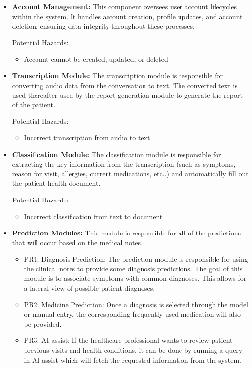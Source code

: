 \documentclass{article}
\begin{document}
\begin{itemize}
    \item \textbf{Account Management:}
    This component oversees user account lifecycles within the system. It handles account creation, profile updates, and account deletion, ensuring data integrity throughout these processes.
    
    Potential Hazards:
    \begin{itemize}
        \item Account cannot be created, updated, or deleted
    \end{itemize}
    
    \item \textbf{Transcription Module:}
    The transcription module is responsible for converting audio data from the conversation to text. The converted text is used thereafter used by the report generation module to generate the report of the patient.

    Potential Hazards:
    \begin{itemize}
        \item Incorrect transcription from audio to text
    \end{itemize}

    \item \textbf{Classification Module:}
    The classification module is responsible for extracting the key information from the transcription (such as symptoms, reason for visit, allergies, current medications, etc..) and automatically fill out the patient health document.

    Potential Hazards:
    \begin{itemize}
        \item Incorrect classification from text to document
    \end{itemize}

    \item \textbf{Prediction Modules:}
    This module is responsible for all of the predictions that will occur based on the medical notes.

    \begin{itemize}
        \item PR1: Diagnosis Prediction: The prediction module is responsible for using the clinical notes to provide some diagnosis predictions. The goal of this module is to associate symptoms with common diagnoses. This allows for a lateral view of possible patient diagnoses.
        \item PR2: Medicine Prediction: Once a diagnosis is selected through the model or manual entry, the corresponding frequently used medication will also be provided.
        \item PR3: AI assist: If the healthcare professional wants to review patient previous visits and health conditions, it can be done by running a query in AI assist which will fetch the requested information from the system.  
    \end{itemize}
    

\end{itemize}
\end{document}
